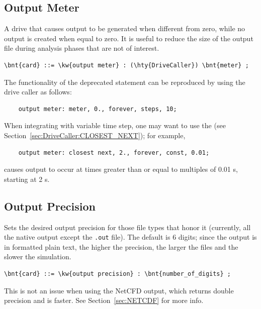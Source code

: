 \subsection{Output Meter}
\label{sec:CONTROLDATA:OUTPUTMETER}
A drive that causes output to be generated when different from zero,
while no output is created when equal to zero.  It is useful to reduce 
the size of the output file during analysis phases that are not of interest.
\begin{Verbatim}[commandchars=\\\{\}]
    \bnt{card} ::= \kw{output meter} : (\hty{DriveCaller}) \bnt{meter} ;
\end{Verbatim}
The functionality of the deprecated  statement
can be reproduced by using the  drive caller as follows:
\begin{verbatim}
    output meter: meter, 0., forever, steps, 10;
\end{verbatim}

When integrating with variable time step,
one may want to use the
 
(see Section~\ref{sec:DriveCaller:CLOSEST_NEXT}); for example,
\begin{verbatim}
    output meter: closest next, 2., forever, const, 0.01;
\end{verbatim}
causes output to occur at times greater than or equal to
multiples of 0.01 s, starting at 2 s.

\subsection{Output Precision}
Sets the desired output precision for those file types that honor it
(currently, all the native output except the \texttt{.out} file).
The default is 6 digits; since the output is in formatted plain text,
the higher the precision, the larger the files and the slower the simulation.
\begin{Verbatim}[commandchars=\\\{\}]
    \bnt{card} ::= \kw{output precision} : \bnt{number_of_digits} ;
\end{Verbatim}
This is not an issue when using the NetCFD output, which returns double
precision and is faster. See Section~\ref{sec:NETCDF} for more info.

